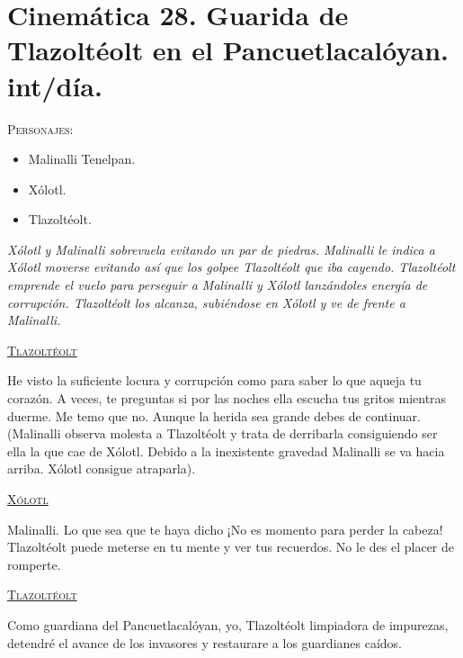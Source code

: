 \section{Cinemática 28. Guarida de Tlazoltéolt en el Pancuetlacalóyan. int/día.}  \label{Cin:Cinematica28}
 \textsc{Personajes}:
 \begin{itemize}
 \item Malinalli Tenelpan.
\item Xólotl.
\item Tlazoltéolt.
 \end{itemize}
\textit{Xólotl y Malinalli sobrevuela evitando un par de piedras. Malinalli le indica a Xólotl moverse evitando así que los golpee Tlazoltéolt que iba cayendo. Tlazoltéolt emprende el vuelo para perseguir a Malinalli y Xólotl lanzándoles energía de corrupción. Tlazoltéolt los alcanza, subiéndose en Xólotl y ve de frente a Malinalli.}
\begin{center}
\textsc{\underline{Tlazoltéolt}}
\\
\par
He visto la suficiente locura y corrupción como para saber lo que aqueja tu corazón. A veces, te preguntas si por las noches ella escucha tus gritos mientras duerme. Me temo que no. Aunque la herida sea grande debes de continuar. (Malinalli observa molesta a Tlazoltéolt y trata de derribarla consiguiendo ser ella la que cae de Xólotl. Debido a la inexistente gravedad Malinalli se va hacia arriba. Xólotl consigue atraparla). 
\\
\par
\textsc{\underline{Xólotl}}
\\
\par
Malinalli. Lo que sea que te haya dicho ¡No es momento para perder la cabeza! Tlazoltéolt puede meterse en tu mente y ver tus recuerdos. No le des el placer de romperte.
\\
\par
\textsc{\underline{Tlazoltéolt}}
\\
\par
Como guardiana del Pancuetlacalóyan, yo, Tlazoltéolt limpiadora de impurezas, detendré el avance de los invasores y restaurare a los guardianes caídos.
\end{center}